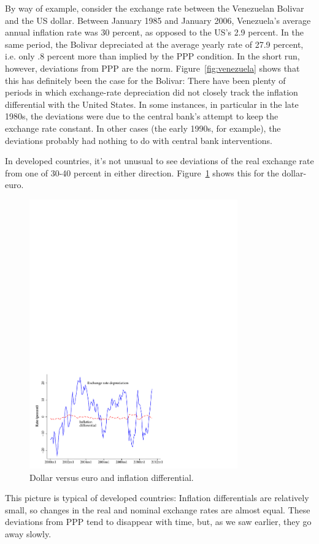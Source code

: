 By way of example, consider the exchange rate between the Venezuelan
Bolivar and the US dollar. Between January 1985 and January 2006,
Venezuela's average annual inflation rate was 30 percent, as opposed to
the US's 2.9 percent. In the same period, the Bolivar
depreciated at the average yearly rate of 27.9 percent, i.e. only .8 percent
more than implied by the PPP condition. In the short run, however,
deviations from PPP are the norm.
Figure~\ref{fig:venezuela} shows that this has definitely been the
case for the Bolivar: There have been plenty of periods in which
exchange-rate depreciation did not closely track the inflation
differential with the United States. In some instances, in
particular in the late 1980s, the deviations were due to the central
bank's attempt to keep the exchange rate constant.
In other cases (the early 1990s, for example), the deviations
probably had nothing to do with central bank interventions.

%
In developed countries, it's not unusual to see deviations of
the real exchange rate from one of 30-40 percent in either direction.
Figure~\ref{fig:us_euro} shows this for the dollar-euro.
\begin{figure}[h]
    \caption{Dollar versus euro and inflation differential.}
    \label{fig:us_euro}
    \centering
    \includegraphics[width=0.8\textwidth]{Figures/us_euro.pdf}
\end{figure}
%
This picture is typical of developed countries: Inflation differentials are relatively small,
so changes in the real and nominal exchange rates are almost equal.
These deviations from PPP tend to disappear with time,
but, as we saw earlier, they go away slowly.


